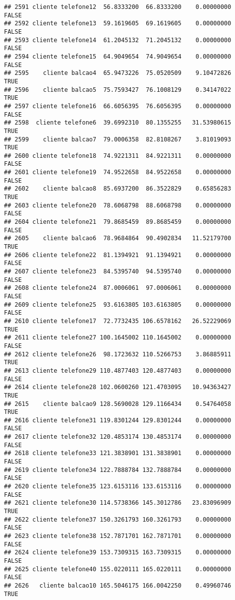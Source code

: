 \documentclass[
]{article}
\begin{document}
\begin{verbatim}
## 2591 cliente telefone12  56.8333200  66.8333200    0.00000000    FALSE
## 2592 cliente telefone13  59.1619605  69.1619605    0.00000000    FALSE
## 2593 cliente telefone14  61.2045132  71.2045132    0.00000000    FALSE
## 2594 cliente telefone15  64.9049654  74.9049654    0.00000000    FALSE
## 2595    cliente balcao4  65.9473226  75.0520509    9.10472826     TRUE
## 2596    cliente balcao5  75.7593427  76.1008129    0.34147022     TRUE
## 2597 cliente telefone16  66.6056395  76.6056395    0.00000000    FALSE
## 2598  cliente telefone6  39.6992310  80.1355255   31.53980615     TRUE
## 2599    cliente balcao7  79.0006358  82.8108267    3.81019093     TRUE
## 2600 cliente telefone18  74.9221311  84.9221311    0.00000000    FALSE
## 2601 cliente telefone19  74.9522658  84.9522658    0.00000000    FALSE
## 2602    cliente balcao8  85.6937200  86.3522829    0.65856283     TRUE
## 2603 cliente telefone20  78.6068798  88.6068798    0.00000000    FALSE
## 2604 cliente telefone21  79.8685459  89.8685459    0.00000000    FALSE
## 2605    cliente balcao6  78.9684864  90.4902834   11.52179700     TRUE
## 2606 cliente telefone22  81.1394921  91.1394921    0.00000000    FALSE
## 2607 cliente telefone23  84.5395740  94.5395740    0.00000000    FALSE
## 2608 cliente telefone24  87.0006061  97.0006061    0.00000000    FALSE
## 2609 cliente telefone25  93.6163805 103.6163805    0.00000000    FALSE
## 2610 cliente telefone17  72.7732435 106.6578162   26.52229069     TRUE
## 2611 cliente telefone27 100.1645002 110.1645002    0.00000000    FALSE
## 2612 cliente telefone26  98.1723632 110.5266753    3.86885911     TRUE
## 2613 cliente telefone29 110.4877403 120.4877403    0.00000000    FALSE
## 2614 cliente telefone28 102.0600260 121.4703095   10.94363427     TRUE
## 2615    cliente balcao9 128.5690028 129.1166434    0.54764058     TRUE
## 2616 cliente telefone31 119.8301244 129.8301244    0.00000000    FALSE
## 2617 cliente telefone32 120.4853174 130.4853174    0.00000000    FALSE
## 2618 cliente telefone33 121.3838901 131.3838901    0.00000000    FALSE
## 2619 cliente telefone34 122.7888784 132.7888784    0.00000000    FALSE
## 2620 cliente telefone35 123.6153116 133.6153116    0.00000000    FALSE
## 2621 cliente telefone30 114.5738366 145.3012786   23.83096909     TRUE
## 2622 cliente telefone37 150.3261793 160.3261793    0.00000000    FALSE
## 2623 cliente telefone38 152.7871701 162.7871701    0.00000000    FALSE
## 2624 cliente telefone39 153.7309315 163.7309315    0.00000000    FALSE
## 2625 cliente telefone40 155.0220111 165.0220111    0.00000000    FALSE
## 2626   cliente balcao10 165.5046175 166.0042250    0.49960746     TRUE

\end{verbatim}
\end{document}
